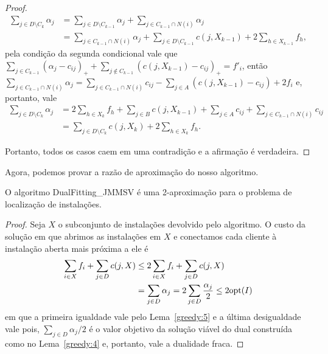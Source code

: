 \begin{proof}
\begin{subequations}
\begin{align*}
\sum_{j \in D \setminus C_k} \alpha_j &= \sum_{j \in D\setminus C_{k-1}} \alpha_j + \sum_{j \in C_{k-1}\cap N(i)} \alpha_j \\
&= \sum_{j \in C_{k-1}\cap N(i)} \alpha_j +  \sum_{j \in D\setminus C_{k-1}}c(j,X_{k-1}) + 2 \sum_{h \in X_{k-1}} f_h,
\end{align*}
\end{subequations}
pela condição da segunda condicional vale que $\sum_{j \in C_{k-1}} (\alpha_j - c_{ij})_+ + \sum_{j \not \in C_{k-1}}(c(j,X_{k-1}) - c_{ij})_+ = f'_i$, então $\sum_{j \in C_{k-1}\cap N(i)} \alpha_j = \sum_{j \in C_{k-1}\cap N(i)} c_{ij} - \sum_{j \in A} (c(j,X_{k-1}) - c_{ij}) + 2f_i$ e, portanto, vale
\begin{subequations}
\begin{align*}
\sum_{j \in D \setminus C_k} \alpha_j &= 2\sum_{h \in X_k} f_h + \sum_{j \in B} c(j,X_{k-1}) + \sum_{j \in A} c_{ij} + \sum_{j \in C_{k-1} \cap N(i)} c_{ij}\\
&= \sum_{j \in D \setminus C_k} c(j,X_k)  + 2 \sum_{h \in X_k} f_h. 
\end{align*}
\end{subequations}

Portanto, todos os casos caem em uma contradição e a afirmação é verdadeira.
\end{proof}


Agora, podemos provar a razão de aproximação do nosso algoritmo.

\begin{theorem}
O algoritmo {\sc DualFitting\_JMMSV} é uma 2-aproximação para o problema de localização de instalações.
\end{theorem} 
\begin{proof}
Seja $X$ o subconjunto de instalações devolvido pelo algoritmo.  O custo da solução em que abrimos as instalações em $X$ e conectamos cada cliente à instalação aberta mais próxima a ele é
\begin{subequations}
\begin{align*}
\sum_{i \in X} f_i + \sum_{j \in D}c(j,X) &\leq 2\sum_{i \in X} f_i + \sum_{j \in D}c(j,X) \\
&= \sum_{j \in D} \alpha_j = 2\sum_{j \in D} \frac{\alpha_j}{2} \leq 2 \mathrm{opt}(I)  
\end{align*}
\end{subequations}
em que a primeira igualdade vale pelo Lema~\ref{greedy:5} e a última desigualdade vale pois, $\sum_{j \in D} \alpha_j/2 $ é o valor objetivo da solução viável do dual construída como no Lema~\ref{greedy:4} e, portanto, vale a dualidade fraca.
\end{proof}

